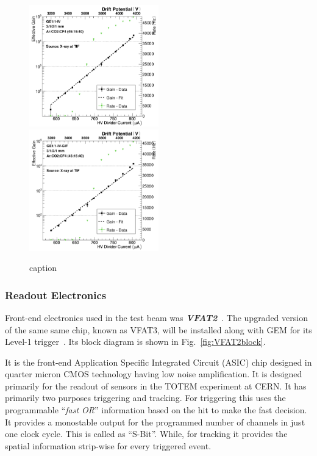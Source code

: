 \begin{figure}[htbp]
    \centering
    \includegraphics[width=0.5\textwidth]{figures/GEM/Gain_curve_GE11_IV_Ar_CO2_CF4.jpeg}%
    \includegraphics[width=0.5\textwidth]{figures/GEM/Gain_curve_GE11_IV_GIF_Ar_CO2_CF4.jpeg}
    \caption{caption}
    \label{fig:gain_GE1/1_IV_GIF}
\end{figure}

\subsubsection{Readout Electronics} %
\label{ssub:readout_electronics}
Front-end electronics used in the test beam was \textbf{\textit{VFAT2}}~\cite{Aspell2007,Berardi2004}.
The upgraded version of the same same chip, known as VFAT3, will be installed along with GEM for its Level-1 trigger~\cite{Licciulli2017}. Its block diagram is shown in Fig.~\ref{fig:VFAT2block}.

It is the front-end Application Specific Integrated Circuit (ASIC) chip designed in quarter micron CMOS technology having low noise amplification. It is designed primarily for the readout of sensors in the TOTEM experiment at CERN. 
It has primarily two purposes triggering and tracking. 
For triggering this uses the programmable ``\textit{fast OR}'' information based on the hit to make the fast decision. 
It provides a monostable output for the programmed number of channels in just one clock cycle. 
This is called as ``S-Bit''. While, for tracking it provides the spatial information strip-wise for every triggered event.

